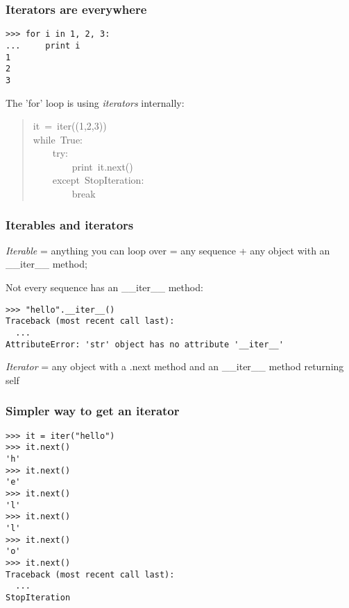 \documentclass[10pt,a4paper,english]{article}
\begin{document}

\hypertarget{iterators-are-everywhere}{}
\subsubsection*{Iterators are everywhere}
\begin{verbatim}>>> for i in 1, 2, 3:
...     print i
1
2
3\end{verbatim}

The 'for' loop is using \emph{iterators} internally:
\begin{quote}{\ttfamily \raggedright \noindent
it~=~iter((1,2,3))~\\
while~True:~\\
~~~~try:~\\
~~~~~~~~print~it.next()~\\
~~~~except~StopIteration:~\\
~~~~~~~~break
}\end{quote}



\hypertarget{iterables-and-iterators}{}
\subsubsection*{Iterables and iterators}

\emph{Iterable} = anything you can loop over = any sequence + any object with an {\_}{\_}iter{\_}{\_} method;

Not every sequence has an {\_}{\_}iter{\_}{\_} method:
\begin{verbatim}>>> "hello".__iter__()
Traceback (most recent call last):
  ...
AttributeError: 'str' object has no attribute '__iter__'\end{verbatim}

\emph{Iterator} = any object with a .next method and an {\_}{\_}iter{\_}{\_} method returning self



\hypertarget{simpler-way-to-get-an-iterator}{}
\subsubsection*{Simpler way to get an iterator}
\begin{verbatim}>>> it = iter("hello")
>>> it.next()
'h'
>>> it.next()
'e'
>>> it.next()
'l'
>>> it.next()
'l'
>>> it.next()
'o'
>>> it.next()
Traceback (most recent call last):
  ...
StopIteration\end{verbatim}
\end{document}
